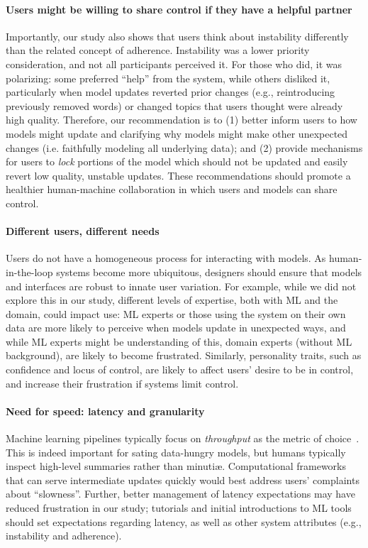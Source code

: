 \paragraph{Users might be willing to share control if they have a helpful partner}
Importantly, our study also shows that users think about instability differently than the related concept of adherence. Instability was a lower priority consideration, and not all participants perceived it. For those who did, it was polarizing: some preferred ``help'' from the system, while others disliked it, particularly when model updates reverted prior changes (e.g., reintroducing previously removed words) or changed topics that users thought were already high quality. Therefore, our recommendation is to (1) better inform users to how models might update and clarifying why models might make other unexpected changes (i.e. faithfully modeling all underlying data); and (2) provide mechanisms for users to \textit{lock} portions of the model which should not be updated and easily revert low quality, unstable updates. These recommendations should promote a healthier human-machine collaboration in which users and models can share control.  

\paragraph{Different users, different needs} 
Users do not have a homogeneous process for interacting with models.
As human-in-the-loop systems become more ubiquitous, designers should
ensure that models and interfaces are robust to innate user variation. For example, while we did not explore this in our study, different levels of expertise, both with ML and the domain, could impact use: ML experts or those using the system on their own data are more likely to perceive when models update in unexpected ways, and while ML experts might be understanding of this, domain experts (without ML background), are likely to become frustrated. Similarly, personality traits, such as confidence and locus of control, are likely to affect users' desire to be in control, and increase their frustration if systems limit control.

\paragraph{Need for speed: latency and granularity}
Machine learning pipelines typically focus on \emph{throughput} as the
metric of choice~\citep{Landset2015AEcosystem,Gani2016AEvaluation}.  This is indeed important for sating data-hungry
models, but humans typically inspect high-level summaries rather than
minuti\ae{}.  Computational frameworks that can serve intermediate updates quickly would best address users' complaints
about ``slowness''. 
Further, better management of latency expectations may have reduced frustration in our study; tutorials and initial introductions to ML tools should set expectations regarding latency, as well as other system attributes (e.g., instability and adherence).  



